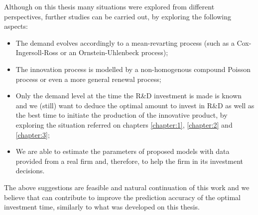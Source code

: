 Although on this thesis many situations were explored from different perspectives, further studies can be carried out, by exploring the following aspects:
\begin{itemize}
	\item The demand evolves accordingly to a mean-revarting process (such as a Cox-Ingersoll-Ross or an Ornstein-Uhlenbeck process);
	
	\item The innovation process is modelled by a non-homogenous compound Poisson process or even a more general renewal process;
	
	\item Only the demand level at the time the R\&D investment is made is known and we (still) want to deduce the optimal amount to invest in R\&D as well as the best time to initiate the production of the innovative product, by exploring the situation referred on chapters \ref{chapter:1}, \ref{chapter:2} and \ref{chapter:3};
	
	\item We are able to estimate the parameters of proposed models with data provided from a real firm and, therefore, to help the firm in its investment decisions.
\end{itemize}


The above suggestions are feasible and natural continuation of this work and we believe that can contribute to improve the prediction accuracy of the optimal investment time, similarly to what was developed on this thesis.
